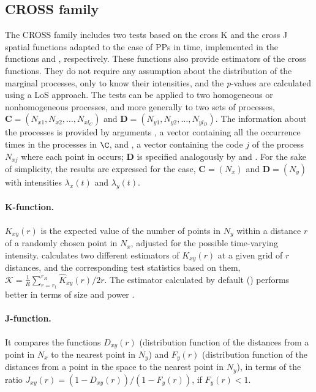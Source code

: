 \subsection{CROSS family}

The CROSS family includes two tests based on  the cross K and the cross J spatial functions adapted to the case of PPs in time,  implemented in the  functions   and , respectively.  These functions also  provide  estimators of the  cross functions. They do not require any assumption about the  distribution of the marginal processes, only to know their intensities, and the \emph{p}-values are calculated using a LoS approach. 	The tests can be applied to two homogeneous or  nonhomogeneous processes, and  more generally to two sets 
of processes, $\mathbf{C}=(N_{x1}, N_{x2}, \ldots, N_{xl_C})$ and $\mathbf{D}=(N_{y1}, N_{y2}, \ldots, N_{yl_D})$. 	
The information about the processes  is provided by  arguments ,  a vector containing all the occurrence times  in the processes in $\C$, and  ,  a vector containing  the code $j$ of the process $N_{xj}$   where each point in  occurs;  $\mathbf{D}$ is specified analogously by  and . For the sake of simplicity, the  results  are  expressed for the case,  $\mathbf{C}=(N_x)$  and $\mathbf{D}=(N_y)$  with intensities $\lambda_x(t)$ and $\lambda_y(t)$. 


\paragraph{K-function.}
 $K_{xy}(r)$ is the expected value of the number of points in $N_y$ within a distance $r$ of a randomly chosen point in $N_x$, adjusted for the possible time-varying intensity. 	
  calculates two different estimators of  $K_{xy}(r)$  at a given grid of $r$ distances, and the corresponding test statistics based on them,  $\mathcal{K}=\frac{1}{R} \sum_{r=r_1}^{r_R}\hat K_{xy}(r)/2r$.    The estimator calculated by default  () performs better in terms of size and power  \citep{Cebrian20}.	


\paragraph{J-function.}

It compares the functions  $D_{xy}(r)$ (distribution function of the distances from a  point  in  $N_x$ to the nearest point in $N_y$) and  $F_{y}(r)$ (distribution function of the distances from a point   in the space to the nearest point in  $N_y$), in terms of the ratio $J_{xy}(r)=(1-D_{xy}(r))/(1-F_{y}(r))$,  if $F_{y}(r)<1$.  

